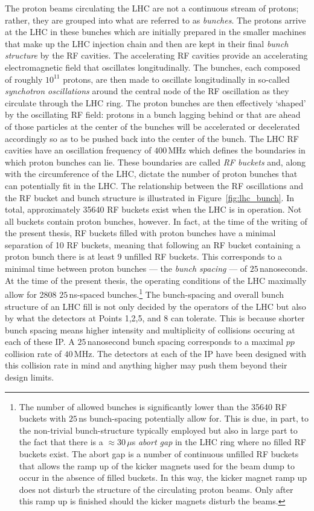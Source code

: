 The proton beams circulating the LHC are not a continuous stream of protons; rather,
they are grouped into what are referred to as \textit{bunches}.
The protons arrive at the LHC in these bunches which are initially prepared
in the smaller machines that make up the LHC injection chain and then are
kept in their final \textit{bunch structure} by the RF cavities.
The accelerating RF cavities provide an accelerating electromagnetic field
that oscillates longitudinally. The bunches, each composed of roughly $10^{11}$ protons,
are then made to oscillate longitudinally in so-called \textit{synchotron oscillations}
around the central node of the RF oscillation as they circulate through the LHC ring.
The proton bunches are then effectively `shaped' by the oscillating RF field: protons in a bunch
lagging behind or that are ahead of those particles at the center of the bunches
will be accelerated or decelerated accordingly so as to be pushed back into the center of the bunch.
The LHC RF cavities have an oscillation frequency of $400$\,MHz which
defines the boundaries in which proton bunches can lie. These boundaries are
called \textit{RF buckets} and, along with
the circumference of the LHC, dictate the number of proton bunches that
can potentially fit in the LHC.
The relationship between the RF oscillations and the RF bucket and bunch structure
is illustrated in Figure~\ref{fig:lhc_bunch}.
In total, approximately 35640 RF buckets exist when the LHC is in operation.
Not all buckets contain proton bunches, however.
In fact, at the time of the writing of the present thesis,
RF buckets filled with proton bunches have a minimal separation of 10 RF buckets, meaning
that following an RF bucket containing a proton bunch there is at least 9 unfilled RF buckets.
This corresponds to a minimal
time between proton bunches --- the \textit{bunch spacing} --- of $25$\,nanoseconds.
At the time of the present thesis, the operating conditions of the LHC maximally
allow for 2808 $25$\,ns-spaced bunches.\footnote{
The number of allowed bunches is significantly lower than the 35640 RF buckets with $25$\,ns
bunch-spacing potentially allow for. This is due, in part, to the non-trivial bunch-structure
typically employed but also in large part to the fact that there is a $\approx 30\,\mu$s \textit{abort gap}
in the LHC ring where no filled RF buckets exist.
The abort gap is a number of continuous unfilled RF buckets that allows the ramp up of the kicker
magnets used for the beam dump to occur in the absence of filled buckets.
In this way, the kicker magnet ramp up does not disturb the structure of the circulating proton beams.
Only after this ramp up is finished should the kicker magnets disturb the beams.
}
The bunch-spacing and overall bunch structure of an LHC fill is not only decided
by the operators of the LHC but also by what the detectors at Points 1,2,5, and 8
can tolerate. This is because shorter bunch spacing means higher intensity and multiplicity
of collisions occuring at each of these IP. A $25$\,nanosecond bunch spacing
corresponds to a maximal $pp$ collision rate of $40$\,MHz. The detectors at each
of the IP have been designed with this collision rate in mind and anything
higher may push them beyond their design limits.

